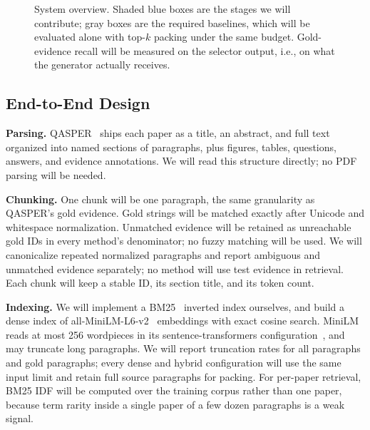 \documentclass[sigconf, nonacm]{acmart}
\newcommand{\minihead}[1]{{\noindent\textbf{#1.} }}
\begin{document}
\begin{figure}[t]
\caption{System overview. Shaded blue boxes are the stages we will contribute; gray boxes are the required baselines, which will be evaluated alone with top-$k$ packing under the same budget. Gold-evidence recall will be measured on the selector output, i.e., on what the generator actually receives.}
\label{fig:pipeline}
\end{figure}

\subsection{End-to-End Design}

\minihead{Parsing} QASPER~\cite{dasigi2021qasper} ships each paper as a title, an abstract, and full text organized into named sections of paragraphs, plus figures, tables, questions, answers, and evidence annotations. We will read this structure directly; no PDF parsing will be needed.

\minihead{Chunking} One chunk will be one paragraph, the same granularity as QASPER's gold evidence. Gold strings will be matched exactly after Unicode and whitespace normalization. Unmatched evidence will be retained as unreachable gold IDs in every method's denominator; no fuzzy matching will be used. We will canonicalize repeated normalized paragraphs and report ambiguous and unmatched evidence separately; no method will use test evidence in retrieval. Each chunk will keep a stable ID, its section title, and its token count.

\minihead{Indexing} We will implement a BM25~\cite{robertson2009bm25} inverted index ourselves, and build a dense index of all-MiniLM-L6-v2~\cite{minilmcard, reimers2019sbert} embeddings with exact cosine search. MiniLM reads at most 256 wordpieces in its sentence-transformers configuration~\cite{minilmcard}, and may truncate long paragraphs. We will report truncation rates for all paragraphs and gold paragraphs; every dense and hybrid configuration will use the same input limit and retain full source paragraphs for packing. For per-paper retrieval, BM25 IDF will be computed over the training corpus rather than one paper, because term rarity inside a single paper of a few dozen paragraphs is a weak signal.
\end{document}
